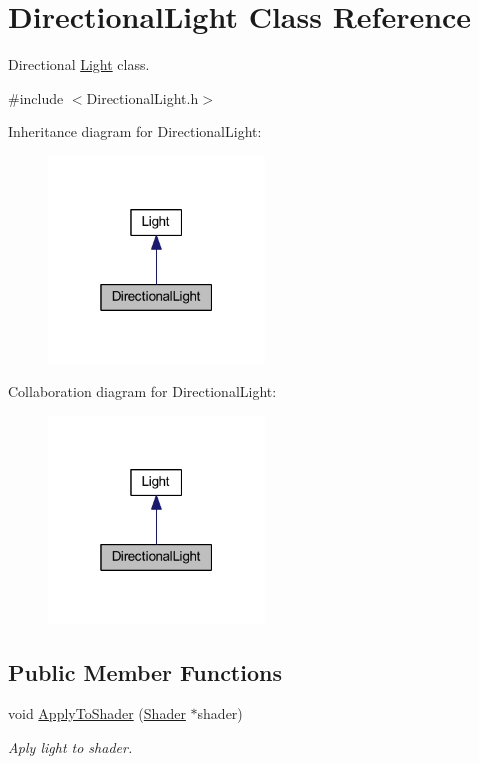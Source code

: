 \hypertarget{class_directional_light}{}\section{Directional\+Light Class Reference}
\label{class_directional_light}


Directional \mbox{\hyperlink{class_light}{Light}} class.  




{\ttfamily \#include $<$Directional\+Light.\+h$>$}



Inheritance diagram for Directional\+Light\+:\nopagebreak
\begin{figure}[H]
\begin{center}
\leavevmode
\includegraphics[width=163pt]{class_directional_light__inherit__graph}
\end{center}
\end{figure}


Collaboration diagram for Directional\+Light\+:\nopagebreak
\begin{figure}[H]
\begin{center}
\leavevmode
\includegraphics[width=163pt]{class_directional_light__coll__graph}
\end{center}
\end{figure}
\subsection*{Public Member Functions}
\begin{DoxyCompactItemize}
\item 
void \mbox{\hyperlink{class_directional_light_a258c15fc957f8ffb76161dc000830418}{Apply\+To\+Shader}} (\mbox{\hyperlink{class_shader}{Shader}} $\ast$shader)
\begin{DoxyCompactList}\small\item\em Aply light to shader. \end{DoxyCompactList}\end{DoxyCompactItemize}
